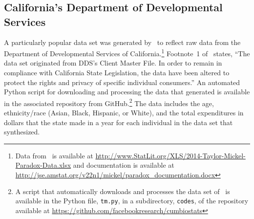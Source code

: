 \documentclass[]{fairmeta}
\begin{document}
\subsection{California's Department of Developmental Services}
\label{dds_taylor-mickel}

A particularly popular data set was generated by~\cite{taylor-mickel}
to reflect raw data from the Department of Developmental Services
of California.\footnote{Data from~\cite{taylor-mickel} is available
at \url{http://www.StatLit.org/XLS/2014-Taylor-Mickel-Paradox-Data.xlsx}
and documentation is available
at \url{http://jse.amstat.org/v22n1/mickel/paradox_documentation.docx}}
Footnote~1 of~\cite{taylor-mickel} states,
``The data set originated from DDS's Client Master File.
In order to remain in compliance with California State Legislation,
the data have been altered to protect the rights and privacy
of specific individual consumers.''
An automated Python script for downloading and processing the data
that \cite{taylor-mickel} generated is available in the associated repository
from GitHub.\footnote{A script that automatically downloads and processes
the data set of~\cite{taylor-mickel} is available in the Python file,
{\tt tm.py}, in a subdirectory, {\tt codes}, of the repository available at
\url{https://github.com/facebookresearch/cumbiostats}}
The data includes the age, ethnicity/race (Asian, Black, Hispanic, or White),
and the total expenditures in dollars that the state made in a year
for each individual in the data set that \cite{taylor-mickel} synthesized.


\newlength{\imsize}
\setlength{\imsize}{.38\textwidth}
\newlength{\fudger}
\setlength{\fudger}{1.6in}
\end{document}
